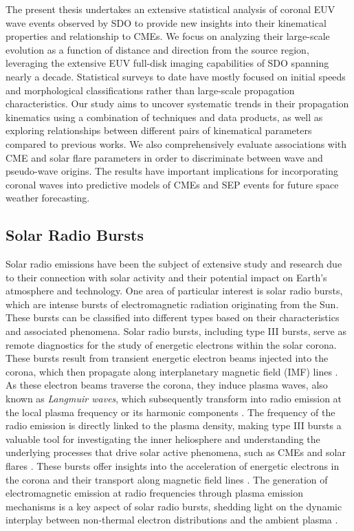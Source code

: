 The present thesis undertakes an extensive statistical analysis of coronal EUV wave events observed by SDO to provide new insights into their kinematical properties and relationship to CMEs. We focus on analyzing their large-scale evolution as a function of distance and direction from the source region, leveraging the extensive EUV full-disk imaging capabilities of SDO spanning nearly a decade. Statistical surveys to date have mostly focused on initial speeds and morphological classifications rather than large-scale propagation characteristics. Our study aims to uncover systematic trends in their propagation kinematics using a combination of techniques and data products, as well as exploring relationships between different pairs of kinematical parameters compared to previous works. We also comprehensively evaluate associations with CME and solar flare parameters in order to discriminate between wave and pseudo-wave origins. The results have important implications for incorporating coronal waves into predictive models of CMEs and SEP events for future space weather forecasting.

\subsection{Solar Radio Bursts}
Solar radio emissions have been the subject of extensive study and research due to their connection with solar activity and their potential impact on Earth's atmosphere and technology. One area of particular interest is solar radio bursts, which are intense bursts of electromagnetic radiation originating from the Sun. These bursts can be classified into different types based on their characteristics and associated phenomena. Solar radio bursts, including type III bursts, serve as remote diagnostics for the study of energetic electrons within the solar corona. These bursts result from transient energetic electron beams injected into the corona, which then propagate along interplanetary magnetic field (IMF) lines \citep{ergun_1998, pick_2006, reid_2020}. As these electron beams traverse the corona, they induce plasma waves, also known as \textit{Langmuir waves}, which subsequently transform into radio emission at the local plasma frequency or its harmonic components \citep{melrose_2017}.
The frequency of the radio emission is directly linked to the plasma density, making type III bursts a valuable tool for investigating the inner heliosphere and understanding the underlying processes that drive solar active phenomena, such as CMEs and solar flares \citep{reid_2014, kontar_2017}. These bursts offer insights into the acceleration of energetic electrons in the corona and their transport along magnetic field lines \citep{reid_2014}. The generation of electromagnetic emission at radio frequencies through plasma emission mechanisms is a key aspect of solar radio bursts, shedding light on the dynamic interplay between non-thermal electron distributions and the ambient plasma \citep{melrose_1980}.

